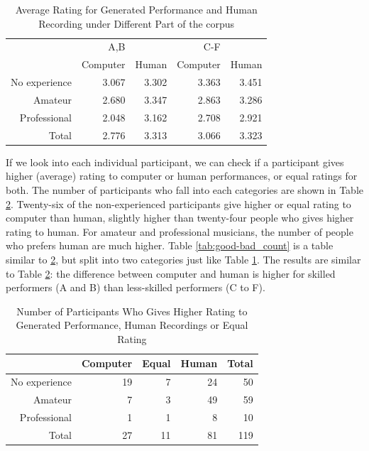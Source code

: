 \begin{table}
   \centering
   \caption{Average Rating for Generated Performance and Human Recording under Different Part of the corpus}
   \label{tab:good-bad_rating}
   \begin{tabular}{r|rr|rr}
\hline
&A,B&&C-F&\\
&Computer &Human &Computer &Human \\
\hline
No experience&3.067&3.302&3.363&3.451\\
Amateur&2.680&3.347&2.863&3.286\\
Professional&2.048&3.162&2.708&2.921\\
\hline
Total&2.776&3.313&3.066&3.323\\
\hline
   \end{tabular}
\end{table}

If we look into each individual participant, we can check if a participant gives higher (average) rating to computer or human performances, or equal ratings for both. The number of participants who fall into each categories are shown in Table \ref{tab:avg_count}. Twenty-six of the non-experienced participants give higher or equal rating to computer than human, slightly higher than twenty-four people who gives higher rating to human. For amateur and professional musicians, the number of people who prefers human are much higher. Table \ref{tab:good-bad_count} is a table similar to \ref{tab:avg_count}, but split into two categories just like Table \ref{tab:good-bad_rating}. The results are similar to Table \ref{tab:avg_count}: the difference between computer and human is higher for skilled performers (A and B) than less-skilled performers (C to F).


\begin{table}
   \centering
   \caption{Number of Participants Who Gives Higher Rating to Generated Performance, Human Recordings or Equal Rating}
   \label{tab:avg_count}
   \begin{tabular}{r|rrr|r}
      \hline
      &Computer&Equal&Human&Total\\
      \hline
      No experience&19&7&24&50\\
      Amateur&7&3&49&59\\
      Professional&1&1&8&10\\
      \hline
      Total&27&11&81&119\\
      \hline
   \end{tabular}
\end{table}

